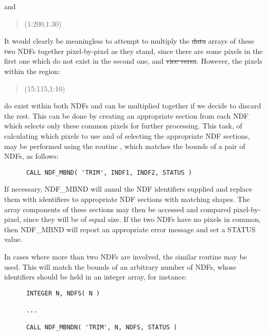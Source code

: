 and

\small
\begin{quote}
\begin{center}
(1:200,1:30)
\end{center}
\end{quote}
\normalsize

It would clearly be meaningless to attempt to multiply the \st{data\/} arrays
of these two NDFs together pixel-by-pixel as they stand, since there are
some pixels in the first one which do not exist in the second one, and \st{vice versa}. 
However, the pixels within the region:

\small
\begin{quote}
\begin{center}
(15:115,1:10)
\end{center}
\end{quote}
\normalsize

do exist within both NDFs and can be multiplied together if we decide to 
discard the rest.
This can be done by creating an appropriate section from each NDF which 
selects only these common pixels for further processing.
This task, of calculating which pixels to use and of selecting the
appropriate NDF sections, may be performed using the routine ,
which matches the bounds of a pair of NDFs, as follows: 

\small
\begin{verbatim}
      CALL NDF_MBND( 'TRIM', INDF1, INDF2, STATUS )
\end{verbatim}
\normalsize

If necessary, NDF\_MBND will annul the NDF identifiers supplied and replace
them with identifiers to appropriate NDF sections with matching shapes. 
The array components of these sections may then be accessed and compared
pixel-by-pixel, since they will be of equal size. 
If the two NDFs have no pixels in common, then NDF\_MBND will report an
appropriate error message and set a STATUS value. 

In cases where more than two NDFs are involved, the similar routine 
 may be used.
This will match the bounds of an arbitrary number of NDFs, whose
identifiers should be held in an integer array, for instance:

\small
\begin{verbatim}
      INTEGER N, NDFS( N )

      ...

      CALL NDF_MBNDN( 'TRIM', N, NDFS, STATUS )
\end{verbatim}
\normalsize

